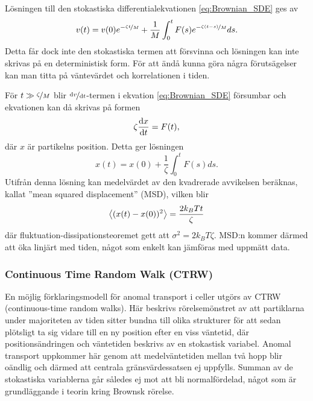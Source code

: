 Lösningen till den stokastiska differentialekvationen \eqref{eq:Brownian_SDE} ges av 
\begin{equation}
    v(t)=v(0)e^{-\nicefrac{\zeta t}{M}}+\frac{1}{M}\int^t_0 F(s)e^{-\nicefrac{\zeta (t-s)}{M}}ds.
\end{equation}
Detta får dock inte den stokastiska termen att försvinna och lösningen kan inte skrivas på en deterministisk form. För att ändå kunna göra några förutsägelser kan man titta på väntevärdet och korrelationen i tiden.

För $t \gg \nicefrac{\zeta}{M}$ blir $\nicefrac{\dd{v}}{\dd{t}}$-termen i ekvation \eqref{eq:Brownian_SDE} försumbar  och ekvationen kan då skrivas på formen
\begin{equation}
    \zeta \dv{x}{t}=F(t),
\end{equation}
där $x$ är partikelns position. Detta ger lösningen
\begin{equation}
    x(t)=x(0)+\frac{1}{\zeta} \int^t_0 F(s)ds.
\end{equation}
Utifrån denna lösning kan medelvärdet av den kvadrerade avvikelsen beräknas, kallat ''mean squared displacement'' (MSD), vilken blir 
\begin{equation} \label{eq:MSD_Brownsk}
    \ev{(x(t)-x(0))^2}=\frac{2k_BTt}{\zeta}
\end{equation}
där fluktuation-dissipationsteoremet gett att $\sigma^2=2k_BT\zeta$.  MSD:n kommer därmed att öka linjärt med tiden, något som enkelt kan jämföras med uppmätt data.



\subsubsection{Continuous Time Random Walk (CTRW)}
En möjlig förklaringsmodell för anomal transport
i celler utgörs av CTRW (continuous-time random
walks)\cite{Hofling&Franosch2013}. Här beskrivs rörelsemönstret av att
partiklarna under majoriteten av tiden sitter bundna till olika
strukturer för att sedan plötsligt ta sig vidare till en ny position
efter en viss väntetid, där positionsändringen och väntetiden beskrivs
av en stokastisk variabel. Anomal transport uppkommer här genom att
medelväntetiden mellan två hopp blir oändlig och därmed att centrala
gränsvärdessatsen ej uppfylls. Summan av de stokastiska variablerna
går således ej mot att bli normalfördelad, något som är grundläggande
i teorin kring Brownsk rörelse. 

